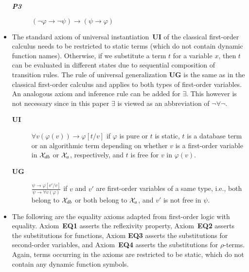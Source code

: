 \documentclass[preprint,11pt]{elsarticle}
\theoremstyle{definition}
\theoremstyle{remark}
\begin{document}
\begin{itemize}
\begin{description}
\item[\textbf{\emph{P3}}]
$(\neg\varphi\rightarrow\neg\psi)\rightarrow(\psi\rightarrow\varphi)$\smallskip

\end{description}

\item The standard axiom of universal instantiation~\textbf{UI} of the classical first-order calculus needs to be restricted to static terms (which do not contain dynamic function names). Otherwise, if we substitute a term $t$ for a variable $x$, then $t$ can be evaluated in different states due to sequential composition of transition rules. 
The rule of universal generalization $\textbf{UG}$ is the same as in the classical first-order calculus and applies to both types of first-order variables. An analogous axiom and inference rule can be added for $\exists$. This however is not necessary since in this paper $\exists$ is viewed as an abbreviation of $\neg \forall \neg$.


\begin{description}

\item[\textbf{UI}] $\forall v (\varphi(v)) \rightarrow \varphi[t/v]$ if $\varphi$ is pure or $t$ is static, $t$ is a database term or an algorithmic term depending on whether $v$ is a first-order variable in ${\cal X}_{db}$ or ${\cal X}_{a}$, respectively, and $t$ is free for $v$ in $\varphi(v)$. \smallskip

\item[\textbf{UG}] $\frac{\psi \rightarrow \varphi[v'/v]}{\psi \rightarrow \forall v (\varphi)}$ if $v$ and $v'$ are first-order variables of a same type, i.e., both belong to ${\cal X}_{db}$ or both belong to ${\cal X}_{a}$, and $v'$ is not free in $\psi$. \smallskip

\end{description}


\item  The following are the equality axioms adapted from first-order logic with equality.
Axiom~\textbf{EQ1} asserts the reflexivity property,
Axiom~\textbf{EQ2} asserts the substitutions for functions,
Axiom \textbf{EQ3} asserts the substitutions for second-order variables, 
and Axiom~\textbf{EQ4} asserts the substitutions for $\rho$-terms. Again,
terms occurring in the axioms are restricted to be static, which do
not contain any dynamic function symbols.

\begin{description}


\end{description}
\end{itemize}
\end{document}
